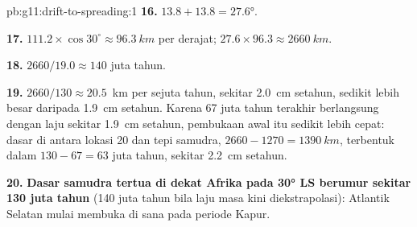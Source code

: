 \begin{solution}{pb:g11:drift-to-spreading:1}
\textbf{16.} $13.8 + 13.8 = \ang{27.6}$.

\textbf{17.} $111.2 \times \cos 30^\circ \approx \qty{96.3}{km}$ per derajat;
$27.6 \times 96.3 \approx \qty{2660}{km}$.

\textbf{18.} $2660/19.0 \approx 140$ juta tahun.

\textbf{19.} $2660/130 \approx \num{20.5}$~km per sejuta tahun, sekitar
\qty{2.0}{cm} setahun, sedikit lebih besar daripada \qty{1.9}{cm} setahun.
Karena 67 juta tahun terakhir berlangsung dengan laju sekitar \qty{1.9}{cm}
setahun, pembukaan awal itu sedikit lebih cepat: dasar di antara lokasi 20 dan
tepi samudra, $2660 - 1270 =
\qty{1390}{km}$, terbentuk dalam $130 - 67 = 63$ juta tahun, sekitar
\qty{2.2}{cm} setahun.

\textbf{20.} \textbf{Dasar samudra tertua di dekat Afrika pada \ang{30} LS
berumur sekitar 130 juta tahun} (140 juta tahun bila laju masa kini
diekstrapolasi): Atlantik Selatan mulai membuka di sana pada periode Kapur.
\end{solution}
